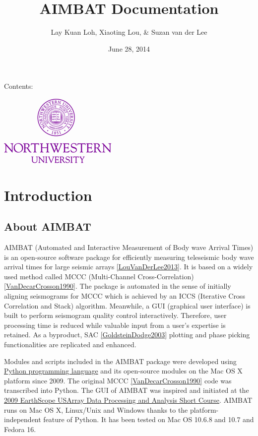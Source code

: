 \documentclass[letterpaper,10pt,english]{sphinxmanual}
\title{AIMBAT Documentation}
\date{June 28, 2014}
\author{Lay Kuan Loh, Xiaoting Lou, \& Suzan van der Lee}
\begin{document}
\maketitle
\tableofcontents
{}\label{index::doc}


Contents:

\includegraphics{NU_Logo_purple.jpg}


\chapter{Introduction}
\label{docfiles/introduction:introduction}\label{docfiles/introduction:welcome-to-aimbat-s-documentation}\label{docfiles/introduction::doc}

\section{About AIMBAT}
\label{docfiles/introduction:about-aimbat}
AIMBAT (Automated and Interactive Measurement of Body wave Arrival Times) is an open-source software package for efficiently measuring teleseismic body wave arrival times for large seismic arrays {\hyperref[docfiles/citations:louvanderlee2013]{{[}LouVanDerLee2013{]}}}. It is based on a widely used method called MCCC (Multi-Channel Cross-Correlation) {\hyperref[docfiles/citations:vandecarcrosson1990]{{[}VanDecarCrosson1990{]}}}. The package is automated in the sense of initially aligning seismograms for MCCC which is achieved by an ICCS (Iterative Cross Correlation and Stack) algorithm. Meanwhile, a GUI (graphical user interface) is built to perform seismogram quality control interactively. Therefore, user processing time is reduced while valuable input from a user's expertise is retained. As a byproduct, SAC {\hyperref[docfiles/citations:goldsteindodge2003]{{[}GoldsteinDodge2003{]}}} plotting and phase picking functionalities are replicated and enhanced.

Modules and scripts included in the AIMBAT package were developed using \href{http://www.python.org/}{Python programming language} and its open-source modules on the Mac OS X platform since 2009. The original MCCC {\hyperref[docfiles/citations:vandecarcrosson1990]{{[}VanDecarCrosson1990{]}}} code was transcribed into Python. The GUI of AIMBAT was inspired and initiated at the \href{http://www.iris.edu/hq/es\_course/content/2009.html}{2009 EarthScope USArray Data Processing and Analysis Short Course}. AIMBAT runs on Mac OS X, Linux/Unix and Windows thanks to the platform-independent feature of Python. It has been tested on Mac OS 10.6.8 and 10.7 and Fedora 16.
\end{document}
